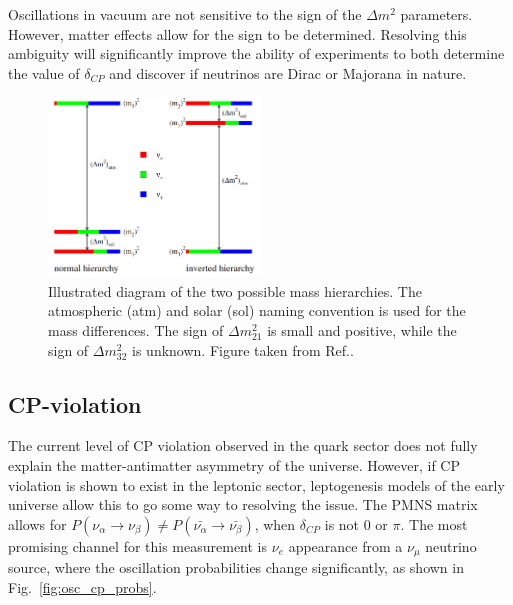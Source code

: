 Oscillations in vacuum are not sensitive to the sign of the $\Delta m^{2}$ parameters. However,
matter effects allow for the sign to be determined. Resolving this ambiguity will significantly
improve the ability of experiments to both determine the value of $\delta_{CP}$ and discover if
neutrinos are Dirac or Majorana in nature.

\begin{figure} %
    \includegraphics[origin=c,width=0.5\textwidth]{diagrams/3-theory/hierarchy.png}
    \caption[Illustration of the two possible mass hierarchies]
    {Illustrated diagram of the two possible mass hierarchies. The atmospheric (atm) and solar
        (sol) naming convention is used for the mass differences. The sign of
        $\Delta m_{21}^{2}$ is small and positive, while the sign of $\Delta m_{32}^{2}$ is
        unknown. Figure taken from Ref.\cite{gouvea2013}.}
    \label{fig:hierarchy}
\end{figure}

\subsection{CP-violation} %
\label{sec:theory_questions_cp} %

The current level of CP violation observed in the quark sector does not fully explain the
matter-antimatter asymmetry of the universe. However, if CP violation is shown to exist in the
leptonic sector, leptogenesis models of the early universe allow this to go some way to resolving
the issue. The PMNS matrix allows for
$P(\nu_{\alpha}\rightarrow\nu_{\beta}) \neq P(\bar{\nu_{\alpha}}\rightarrow\bar{\nu_{\beta}})$,
when $\delta_{CP}$ is not 0 or $\pi$. The most promising channel for this measurement is $\nu_{e}$
appearance from a $\nu_{\mu}$ neutrino source, where the oscillation probabilities change
significantly, as shown in Fig.~\ref{fig:osc_cp_probs}.

